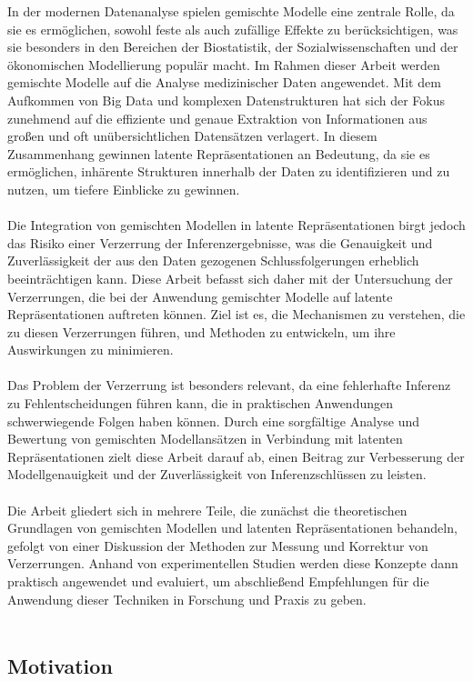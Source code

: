 \documentclass[%
thesis=student,%
coverpage=false,%
titlepage=false,%
headmarks=true, %
german,%
font=libertine, %
math=newpxtx, %
BCOR=5mm,%
coverBCOR=11mm%
]{tumbook}
\theoremstyle{break}
\begin{document}
In der modernen Datenanalyse spielen gemischte Modelle eine zentrale Rolle, da sie es ermöglichen, sowohl feste als auch zufällige Effekte zu berücksichtigen, was sie besonders in den Bereichen der Biostatistik, der Sozialwissenschaften und der ökonomischen Modellierung populär macht. Im Rahmen dieser Arbeit werden gemischte Modelle auf die Analyse medizinischer Daten angewendet. Mit dem Aufkommen von Big Data und komplexen Datenstrukturen hat sich der Fokus zunehmend auf die effiziente und genaue Extraktion von Informationen aus großen und oft unübersichtlichen Datensätzen verlagert. In diesem Zusammenhang gewinnen latente Repräsentationen an Bedeutung, da sie es ermöglichen, inhärente Strukturen innerhalb der Daten zu identifizieren und zu nutzen, um tiefere Einblicke zu gewinnen.\\
\\
Die Integration von gemischten Modellen in latente Repräsentationen birgt jedoch das Risiko einer Verzerrung der Inferenzergebnisse, was die Genauigkeit und Zuverlässigkeit der aus den Daten gezogenen Schlussfolgerungen erheblich beeinträchtigen kann. Diese Arbeit befasst sich daher mit der Untersuchung der Verzerrungen, die bei der Anwendung gemischter Modelle auf latente Repräsentationen auftreten können. Ziel ist es, die Mechanismen zu verstehen, die zu diesen Verzerrungen führen, und Methoden zu entwickeln, um ihre Auswirkungen zu minimieren.\\
\\
Das Problem der Verzerrung ist besonders relevant, da eine fehlerhafte Inferenz zu Fehlentscheidungen führen kann, die in praktischen Anwendungen schwerwiegende Folgen haben können. Durch eine sorgfältige Analyse und Bewertung von gemischten Modellansätzen in Verbindung mit latenten Repräsentationen zielt diese Arbeit darauf ab, einen Beitrag zur Verbesserung der Modellgenauigkeit und der Zuverlässigkeit von Inferenzschlüssen zu leisten.\\
\\
Die Arbeit gliedert sich in mehrere Teile, die zunächst die theoretischen Grundlagen von gemischten Modellen und latenten Repräsentationen behandeln, gefolgt von einer Diskussion der Methoden zur Messung und Korrektur von Verzerrungen. Anhand von experimentellen Studien werden diese Konzepte dann praktisch angewendet und evaluiert, um abschließend Empfehlungen für die Anwendung dieser Techniken in Forschung und Praxis zu geben.\\
\\
\subsection{Motivation}
\end{document}

